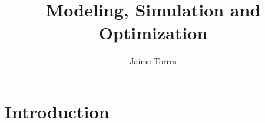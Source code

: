 \documentclass{clgrammar}
\title{Modeling, Simulation and Optimization}
\author{Jaime Torres}
\begin{document}
\maketitle

\tableofcontents

\mainmatter
\chapter{Introduction}
\end{document}
